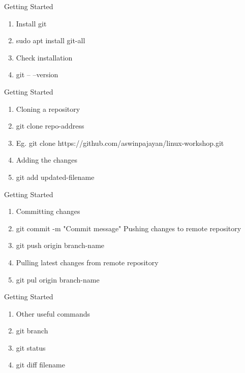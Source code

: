 \documentclass{beamer}
\newcounter{saveenumi}
\newcommand{\seti}{\setcounter{saveenumi}{\value{enumi}}}
\newcommand{\conti}{\setcounter{enumi}{\value{saveenumi}}}
\begin{document}
{\begin{frame}{Getting Started}
	\begin{enumerate}
		\item<2-> Install git
		\item<2-> sudo apt install git-all
		\item<3-> Check installation
		\item<3-> git -- --version		
	\end{enumerate}
\end{frame}

\begin{frame}{Getting Started}
	\begin{enumerate}
		\item<2-> Cloning a repository
		\item<2-> git clone repo-address
		\item<2-> Eg. git clone https://github.com/aswinpajayan/linux-workshop.git
		\item<3-> Adding the changes
		\item<3-> git add updated-filename
		\seti
	\end{enumerate}
\end{frame}

\begin{frame}{Getting Started}
	\begin{enumerate}
		\conti
		\item<2-> Committing changes
		\item<2-> git commit -m "Commit message"
		\itme<3-> Pushing changes to remote repository
		\item<3-> git push origin branch-name
		\item<4-> Pulling latest changes from remote repository
		\item<4-> git pul origin branch-name
		\seti
	\end{enumerate}
\end{frame}

\begin{frame}{Getting Started}
	\begin{enumerate}
		\conti
		\item<2-> Other useful commands
		\item<2-> git branch
		\item<2-> git status
		\item<2-> git diff filename
	\end{enumerate}
\end{frame}

}
\end{document}
